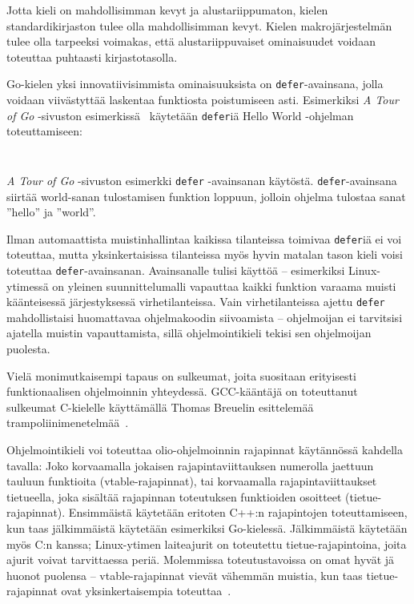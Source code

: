 Jotta kieli on mahdollisimman kevyt ja alustariippumaton, kielen
standardikirjaston tulee olla mahdollisimman kevyt. Kielen makrojärjestelmän
tulee olla tarpeeksi voimakas, että alustariippuvaiset ominaisuudet voidaan
toteuttaa puhtaasti kirjastotasolla.

Go-kielen yksi innovatiivisimmista ominaisuuksista on \texttt{defer}-avainsana,
jolla voidaan viivästyttää laskentaa funktiosta poistumiseen asti. Esimerkiksi
\emph{A Tour of Go} -sivuston esimerkissä~\citep{gotourdefer} käytetään
\texttt{defer}iä Hello World -ohjelman toteuttamiseen:

\begin{listing}[ht!]
    \inputminted{Go}{defer.go}
    \inputminted{text}{defer-output.txt}
    \caption{\emph{A Tour of Go} -sivuston esimerkki \texttt{defer} -avainsanan
    käytöstä. \texttt{defer}-avainsana siirtää world-sanan tulostamisen
    funktion loppuun, jolloin ohjelma tulostaa sanat ''hello'' ja ''world''.}
\end{listing}

\FloatBarrier

Ilman automaattista muistinhallintaa kaikissa tilanteissa toimivaa
\texttt{defer}iä ei voi toteuttaa, mutta yksinkertaisissa tilanteissa myös
hyvin matalan tason kieli voisi toteuttaa \texttt{defer}-avainsanan.
Avainsanalle tulisi käyttöä -- esimerkiksi Linux-ytimessä on yleinen
suunnittelumalli vapauttaa kaikki funktion varaama muisti käänteisessä
järjestyksessä virhetilanteissa. Vain virhetilanteissa ajettu \texttt{defer}
mahdollistaisi huomattavaa ohjelmakoodin siivoamista -- ohjelmoijan ei
tarvitsisi ajatella muistin vapauttamista, sillä ohjelmointikieli tekisi sen
ohjelmoijan puolesta.

Vielä monimutkaisempi tapaus on sulkeumat, joita suositaan erityisesti
funktionaalisen ohjelmoinnin yhteydessä. GCC-kääntäjä on toteuttanut sulkeumat
C-kielelle käyttämällä Thomas Breuelin esittelemää
trampoliinimenetelmää~\citep{gccnested, cppclosure}.

Ohjelmointikieli voi toteuttaa olio-ohjelmoinnin rajapinnat käytännössä kahdella
tavalla: Joko korvaamalla jokaisen rajapintaviittauksen numerolla jaettuun
tauluun funktioita (vtable-rajapinnat), tai korvaamalla rajapintaviittaukset
tietueella, joka sisältää rajapinnan toteutuksen funktioiden osoitteet
(tietue-rajapinnat). Ensimmäistä käytetään eritoten C++:n rajapintojen
toteuttamiseen, kun taas jälkimmäistä käytetään esimerkiksi Go-kielessä.
Jälkimmäistä käytetään myös C:n kanssa; Linux-ytimen laiteajurit on toteutettu
tietue-rajapintoina, joita ajurit voivat tarvittaessa periä. Molemmissa
toteutustavoissa on omat hyvät jä huonot puolensa -- vtable-rajapinnat vievät
vähemmän muistia, kun taas tietue-rajapinnat ovat yksinkertaisempia
toteuttaa~\citationneeded.

